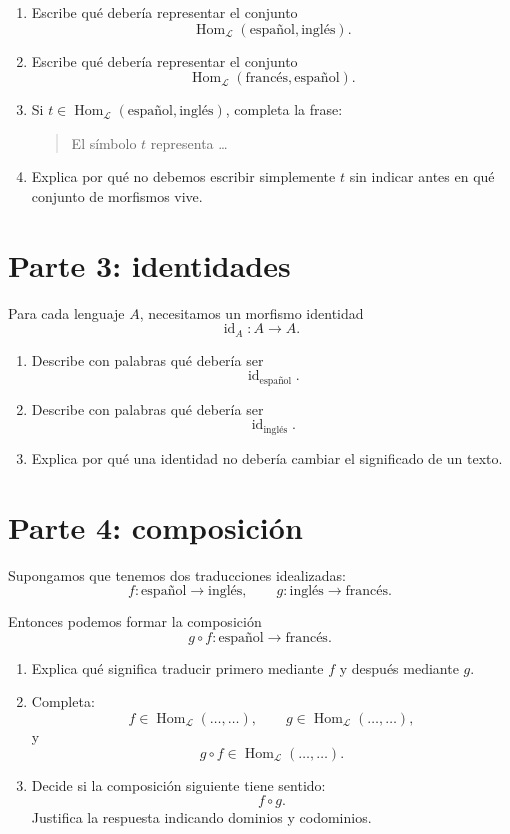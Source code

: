 \documentclass[11pt,a4paper]{article}
\newcommand{\Cat}{\mathcal{L}}
\newcommand{\Hom}{\operatorname{Hom}}
\newcommand{\id}{\operatorname{id}}
\begin{document}
\begin{enumerate}
  \item Escribe qué debería representar el conjunto
  \[
    \Hom_{\Cat}(\text{español},\text{inglés}).
  \]

  \item Escribe qué debería representar el conjunto
  \[
    \Hom_{\Cat}(\text{francés},\text{español}).
  \]

  \item Si \(t\in \Hom_{\Cat}(\text{español},\text{inglés})\), completa la frase:

  \begin{quote}
    El símbolo \(t\) representa \ldots
  \end{quote}

  \item Explica por qué no debemos escribir simplemente \(t\) sin indicar antes
  en qué conjunto de morfismos vive.
\end{enumerate}

\section*{Parte 3: identidades}

Para cada lenguaje \(A\), necesitamos un morfismo identidad
\[
  \id_A:A\to A.
\]

\begin{enumerate}
  \item Describe con palabras qué debería ser
  \[
    \id_{\text{español}}.
  \]

  \item Describe con palabras qué debería ser
  \[
    \id_{\text{inglés}}.
  \]

  \item Explica por qué una identidad no debería cambiar el significado de un
  texto.
\end{enumerate}

\section*{Parte 4: composición}

Supongamos que tenemos dos traducciones idealizadas:
\[
  f:\text{español}\to \text{inglés},
  \qquad
  g:\text{inglés}\to \text{francés}.
\]

Entonces podemos formar la composición
\[
  g\circ f:\text{español}\to \text{francés}.
\]

\begin{enumerate}
  \item Explica qué significa traducir primero mediante \(f\) y después mediante
  \(g\).

  \item Completa:
  \[
    f\in \Hom_{\Cat}(\ldots,\ldots),
    \qquad
    g\in \Hom_{\Cat}(\ldots,\ldots),
  \]
  y
  \[
    g\circ f\in \Hom_{\Cat}(\ldots,\ldots).
  \]

  \item Decide si la composición siguiente tiene sentido:
  \[
    f\circ g.
  \]
  Justifica la respuesta indicando dominios y codominios.
\end{enumerate}
\end{document}
